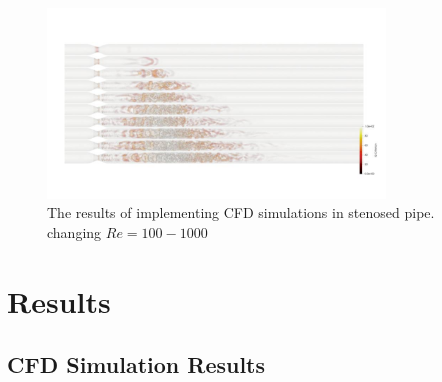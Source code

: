 \documentclass[times,twocolumn,final]{elsarticle}
\begin{document}
\begin{figure}[!t]
\centering
\includegraphics[width=0.8\textwidth]{./Figures/Figure2_Methods_CFD.jpg}
\caption{The results of implementing CFD simulations in stenosed pipe. changing $Re=100-1000$}
\label{fig:Results_CFD}
\end{figure}


\section{Results}
\subsection{CFD Simulation Results}


\end{document}
